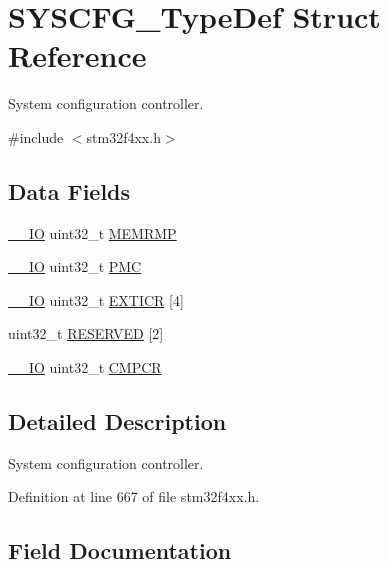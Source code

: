 \hypertarget{struct_s_y_s_c_f_g___type_def}{}\section{S\+Y\+S\+C\+F\+G\+\_\+\+Type\+Def Struct Reference}
\label{struct_s_y_s_c_f_g___type_def}


System configuration controller.  




{\ttfamily \#include $<$stm32f4xx.\+h$>$}

\subsection*{Data Fields}
\begin{DoxyCompactItemize}
\item 
\hyperlink{group___c_m_s_i_s__core__definitions_gaec43007d9998a0a0e01faede4133d6be}{\+\_\+\+\_\+\+IO} uint32\+\_\+t \hyperlink{struct_s_y_s_c_f_g___type_def_ab36c409d0a009e3ce5a89ac55d3ff194}{M\+E\+M\+R\+MP}
\item 
\hyperlink{group___c_m_s_i_s__core__definitions_gaec43007d9998a0a0e01faede4133d6be}{\+\_\+\+\_\+\+IO} uint32\+\_\+t \hyperlink{struct_s_y_s_c_f_g___type_def_a2130abf1fefb63ce4c4b138fd8c9822a}{P\+MC}
\item 
\hyperlink{group___c_m_s_i_s__core__definitions_gaec43007d9998a0a0e01faede4133d6be}{\+\_\+\+\_\+\+IO} uint32\+\_\+t \hyperlink{struct_s_y_s_c_f_g___type_def_a52f7bf8003ba69d66a4e86dea6eeab65}{E\+X\+T\+I\+CR} \mbox{[}4\mbox{]}
\item 
uint32\+\_\+t \hyperlink{struct_s_y_s_c_f_g___type_def_afaf27b66c1edc60064db3fa6e693fb59}{R\+E\+S\+E\+R\+V\+ED} \mbox{[}2\mbox{]}
\item 
\hyperlink{group___c_m_s_i_s__core__definitions_gaec43007d9998a0a0e01faede4133d6be}{\+\_\+\+\_\+\+IO} uint32\+\_\+t \hyperlink{struct_s_y_s_c_f_g___type_def_a08ddbac546fa9928256654d31255c8c3}{C\+M\+P\+CR}
\end{DoxyCompactItemize}


\subsection{Detailed Description}
System configuration controller. 

Definition at line 667 of file stm32f4xx.\+h.



\subsection{Field Documentation}
\mbox{\label{struct_s_y_s_c_f_g___type_def_a08ddbac546fa9928256654d31255c8c3}} 
